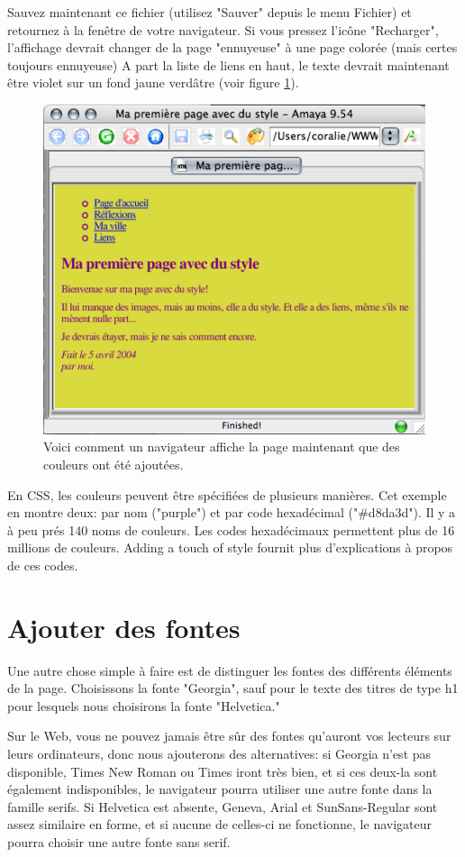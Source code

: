 Sauvez maintenant ce fichier (utilisez "Sauver" depuis le menu Fichier) et retournez à la fenêtre de votre navigateur. Si vous pressez l'icône "Recharger", l'affichage devrait changer de la page "ennuyeuse" à une page colorée (mais certes toujours ennuyeuse) A part la liste de liens en haut, le texte devrait maintenant être violet sur un fond jaune verdâtre (voir figure \ref{fig:screen3}). 
\begin{figure}[t]
	\begin{center}
		\caption{Voici comment un navigateur affiche la page maintenant que des couleurs ont été ajoutées. }
		\label{fig:screen3}
		\includegraphics{voronin/img/capture2.png}	
	\end{center}
\end{figure}
En CSS, les couleurs peuvent être spécifiées de plusieurs manières. Cet exemple en montre deux: par nom ("purple") et par code hexadécimal ("\#d8da3d"). Il y a à peu prés 140 noms de couleurs. Les codes hexadécimaux permettent plus de 16 millions de couleurs. Adding a touch of style fournit plus d'explications à propos de ces codes. 
\normalsize
\section{Ajouter des fontes}
Une autre chose simple à faire est de distinguer les fontes des différents éléments de la page. Choisissons la fonte "Georgia", sauf pour le texte des titres de type h1 pour lesquels nous choisirons la fonte "Helvetica."

Sur le Web, vous ne pouvez jamais être sûr des fontes qu'auront vos lecteurs sur leurs ordinateurs, donc nous ajouterons des alternatives: si Georgia n'est pas disponible, Times New Roman ou Times iront très bien, et si ces deux-la sont également indisponibles, le navigateur pourra utiliser une autre fonte dans la famille serifs. Si Helvetica est absente, Geneva, Arial et SunSans-Regular sont assez similaire en forme, et si aucune de celles-ci ne fonctionne, le navigateur pourra choisir une autre fonte sans serif.

